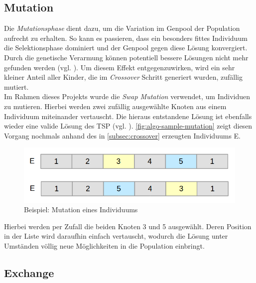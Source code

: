 \documentclass[12pt,a4paper]{scrreprt}
\begin{document}
\subsection{Mutation}
\label{subsec:mutation}

Die \textit{Mutationsphase} dient dazu, um die Variation im Genpool der Population aufrecht zu erhalten. So kann es passieren, dass ein besonders fittes Individuum die Selektionsphase dominiert und der Genpool gegen diese Lösung konvergiert. Durch die genetische Verarmung können potentiell bessere Lösungen nicht mehr gefunden werden (vgl. \cite{rongqu14}). Um diesem Effekt entgegenzuwirken, wird ein sehr kleiner Anteil aller Kinder, die im \textit{Crossover} Schritt generiert wurden, zufällig mutiert.\\
Im Rahmen dieses Projekts wurde die \textit{Swap Mutation} verwendet, um Individuen zu mutieren. Hierbei werden zwei zufällig ausgewählte Knoten aus einem Individuum miteinander vertauscht. Die hieraus entstandene Lösung ist ebenfalls wieder eine valide Lösung des TSP (vgl. \cite{jacobsen12B}). \autoref{fig:algo-sample-mutation} zeigt diesen Vorgang nochmals anhand des in \autoref{subsec:crossover} erzeugten Individuums E.


\begin{figure}[ht]
  	\centering
	\includegraphics[width=400pt]{images/algo_05_mutation.png}
	\caption{Beispiel: Mutation eines Individuums}
	\label{fig:algo-sample-mutation}
\end{figure}

Hierbei werden per Zufall die beiden Knoten 3 und 5 ausgewählt. Deren Position in der Liste wird daraufhin einfach vertauscht, wodurch die Lösung unter Umständen völlig neue Möglichkeiten in die Population einbringt.

\subsection{Exchange}
\label{subsec:exchange}
\end{document}
